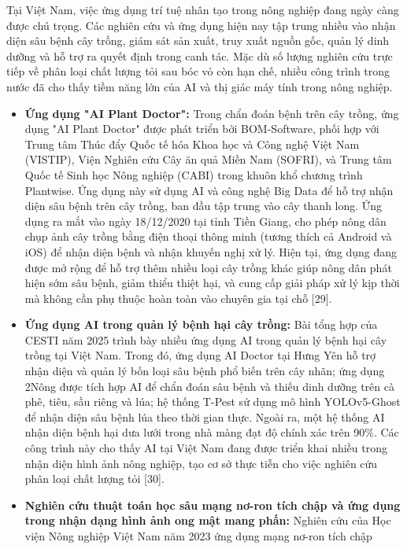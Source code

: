 \documentclass[
]{article}
\begin{document}
Tại Việt Nam, việc ứng dụng trí tuệ nhân tạo trong nông nghiệp đang ngày
càng được chú trọng. Các nghiên cứu và ứng dụng hiện nay tập trung nhiều
vào nhận diện sâu bệnh cây trồng, giám sát sản xuất, truy xuất nguồn
gốc, quản lý dinh dưỡng và hỗ trợ ra quyết định trong canh tác. Mặc dù
số lượng nghiên cứu trực tiếp về phân loại chất lượng tỏi sau bóc vỏ còn
hạn chế, nhiều công trình trong nước đã cho thấy tiềm năng lớn của AI và
thị giác máy tính trong nông nghiệp.

\begin{itemize}
\item
  \textbf{Ứng dụng "AI Plant Doctor":} Trong chẩn đoán bệnh trên cây
  trồng, ứng dụng "AI Plant Doctor" được phát triển bởi BOM-Software,
  phối hợp với Trung tâm Thúc đẩy Quốc tế hóa Khoa học và Công nghệ Việt
  Nam (VISTIP), Viện Nghiên cứu Cây ăn quả Miền Nam (SOFRI), và Trung
  tâm Quốc tế Sinh học Nông nghiệp (CABI) trong khuôn khổ chương trình
  Plantwise. Ứng dụng này sử dụng AI và công nghệ Big Data để hỗ trợ
  nhận diện sâu bệnh trên cây trồng, ban đầu tập trung vào cây thanh
  long. Ứng dụng ra mắt vào ngày 18/12/2020 tại tỉnh Tiền Giang, cho
  phép nông dân chụp ảnh cây trồng bằng điện thoại thông minh (tương
  thích cả Android và iOS) để nhận diện bệnh và nhận khuyến nghị xử lý.
  Hiện tại, ứng dụng đang được mở rộng để hỗ trợ thêm nhiều loại cây
  trồng khác giúp nông dân phát hiện sớm sâu bệnh, giảm thiểu thiệt hại,
  và cung cấp giải pháp xử lý kịp thời mà không cần phụ thuộc hoàn toàn
  vào chuyên gia tại chỗ {[}29{]}.
\item
  \textbf{Ứng dụng AI trong quản lý bệnh hại cây trồng:} Bài tổng hợp
  của CESTI năm 2025 trình bày nhiều ứng dụng AI trong quản lý bệnh hại
  cây trồng tại Việt Nam. Trong đó, ứng dụng AI Doctor tại Hưng Yên hỗ
  trợ nhận diện và quản lý bốn loại sâu bệnh phổ biến trên cây nhãn; ứng
  dụng 2Nông được tích hợp AI để chẩn đoán sâu bệnh và thiếu dinh dưỡng
  trên cà phê, tiêu, sầu riêng và lúa; hệ thống T-Pest sử dụng mô hình
  YOLOv5-Ghost để nhận diện sâu bệnh lúa theo thời gian thực. Ngoài ra,
  một hệ thống AI nhận diện bệnh hại dưa lưới trong nhà màng đạt độ
  chính xác trên 90\%. Các công trình này cho thấy AI tại Việt Nam đang
  được triển khai nhiều trong nhận diện hình ảnh nông nghiệp, tạo cơ sở
  thực tiễn cho việc nghiên cứu phân loại chất lượng tỏi {[}30{]}.
\item
  \textbf{Nghiên cứu thuật toán học sâu mạng nơ-ron tích chập và ứng
  dụng trong nhận dạng hình ảnh ong mật mang phấn:} Nghiên cứu của Học
  viện Nông nghiệp Việt Nam năm 2023 ứng dụng mạng nơ-ron tích chập

\end{itemize}
\end{document}
